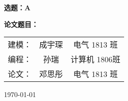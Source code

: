 \begin{titlepage}
  \begin{center}
    \vspace*{\fill}
    {\bfseries 选题：A}
    \vspace*{\fill}

    {\bfseries 论文题目：}

    \itshape
    \begin{tabular}{ccc}
      建模：& 成宇琛 & 电气 1813 班 \\
      编程：& 孙瑞 & 计算机 1806班 \\
      论文：& 邓思彤 & 电气 1813 班 \\
    \end{tabular}

    \today
  \end{center}
\end{titlepage}
